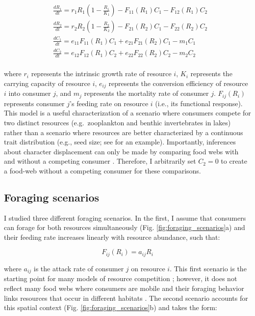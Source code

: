 \documentclass[11pt,]{article}
\begin{document}
\begin{equation} \label{eq:1}
  \begin{split}
     & \frac{dR_1}{dt}=r_1R_1(1-\frac{R_1}{K_1})-F_{11}(R_1)C_1-F_{12}(R_1)C_2 \\
     & \frac{dR_2}{dt}=r_2R_2(1-\frac{R_2}{K_2})-F_{21}(R_2)C_1-F_{22}(R_2)C_2 \\
     & \frac{dC_1}{dt}=e_{11}F_{11}(R_1)C_1+e_{21}F_{21}(R_2)C_1-m_1C_1 \\
     & \frac{dC_2}{dt}=e_{12}F_{12}(R_1)C_2+e_{22}F_{22}(R_2)C_2-m_2C_2 \\
  \end{split}
\end{equation}

where \(r_i\) represents the intrinsic growth rate of resource \(i\),
\(K_i\) represents the carrying capacity of resource \(i\), \(e_{ij}\)
represents the conversion efficiency of resource \(i\) into consumer
\(j\), and \(m_j\) represents the mortality rate of consumer \(j\).
\(F_{ij}(R_i)\) represents consumer \(j\)'s feeding rate on resource
\(i\) (i.e., its functional response). This model is a useful
characterization of a scenario where consumers compete for two distinct
resources (e.g.~zooplankton and benthic invertebrates in lakes) rather
than a scenario where resources are better characterized by a continuous
trait distribution (e.g., seed size; see \citet{Taper1985} for an
example). Importantly, inferences about character displacement can only
be made by comparing food webs with and without a competing consumer
\citep{Schluter1992}. Therefore, I arbitrarily set \(C_2=0\) to create a
food-web without a competing consumer for these comparisons.

\subsection{Foraging scenarios}\label{foraging-scenarios}

I studied three different foraging scenarios. In the first, I assume
that consumers can forage for both resources simultaneously (Fig.
\ref{fig:foraging_scenarios}a) and their feeding rate increases linearly
with resource abundance, such that:

\begin{equation} \label{eq:2}
  F_{ij}(R_i)=a_{ij}R_i
\end{equation}

where \(a_{ij}\) is the attack rate of consumer \(j\) on resource \(i\).
This first scenario is the starting point for many models of resource
competition \citep{MacArthur1972}; however, it does not reflect many
food webs where consumers are mobile and their foraging behavior links
resources that occur in different habitats \citep{Holt1984}. The second
scenario accounts for this spatial context (Fig.
\ref{fig:foraging_scenarios}b) and takes the form:
\end{document}
